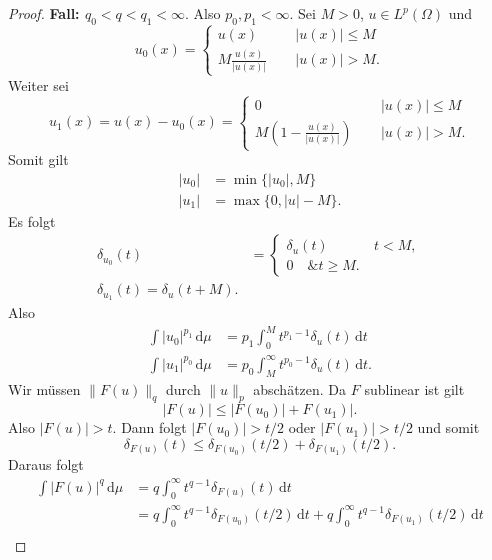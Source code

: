 \documentclass[
paper=a4,
bibtotocnumbered,
liststotocnumbered,
tablecaptionabove,
pointlessnumbers,
twoside,
openright,
10pt
]
{report}
\theoremstyle{definition}
\numberwithin{equation}{chapter}
\begin{document}
\begin{proof}
\textbf{Fall: $q_0<q<q_1<\infty$}. Also $p_0, p_1<\infty$.  Sei $M>0$, $u\in L^p(\Omega)$ und
\begin{equation}
u_0(x)= \begin{cases}
u(x) \quad &\ |u(x)| \le M\\
M \frac{u(x)}{|u(x)|} \quad &\ |u(x)|>M.
\end{cases}
\end{equation}
Weiter sei
\begin{equation}
u_1(x) = u(x) - u_0(x) = \begin{cases}
0 \quad &\ |u(x)| \le M\\
M(1- \frac{u(x)}{|u(x)|}) \quad &\ |u(x)|>M.
\end{cases}
\end{equation}
Somit gilt
\begin{align}
|u_0| &= \min\{ |u_0|, M\}\\
|u_1| &= \max\{ 0, |u|-M\}.
\end{align}
Es folgt
\begin{align}
\delta_{u_0}(t) &= \begin{cases}
\delta_u(t) \quad &\ t<M,\\
0 \quad \& t\ge M.
\end{cases}\\
\delta_{u_1}(t) = \delta_u(t+M).
\end{align}
Also
\begin{align}
\int |u_0|^{p_1} \, \mathrm d\mu &= p_1 \int_0^M t^{p_1-1} \delta_u(t) \, \mathrm dt \label{eq:23.6:1}\\
\int |u_1|^{p_0}\, \mathrm d\mu &= p_0 \int_M^\infty t^{p_0-1} \delta_u(t) \, \mathrm dt.\label{eq:23.6:2}
\end{align}
Wir müssen $\| F(u)\|_q$ durch $\| u\|_p$ abschätzen. Da $F$ sublinear ist gilt
\begin{equation}
|F(u)| \le |F(u_0)|+ F(u_1)|.
\end{equation}
Also $|F(u)|>t$. Dann folgt $|F(u_0)|>t/2$ oder $|F(u_1)|>t/2$ und somit 
\begin{equation}
\delta_{F(u)} (t) \le \delta_{F(u_0)} (t/2) + \delta_{F(u_1)} (t/2).
\end{equation}
Daraus folgt
\begin{align}
\int |F(u)|^q \, \mathrm d\mu &= q \int_0^\infty t^{q-1} \delta_{F(u)}(t)\, \mathrm dt \\
&= q \int_0^\infty t^{q-1} \delta_{F(u_0)} (t/2)\, \mathrm dt + q \int_0^\infty t^{q-1} \delta_{F(u_1)} (t/2)\, \mathrm dt\\

\end{align}
\end{proof}
\end{document}
